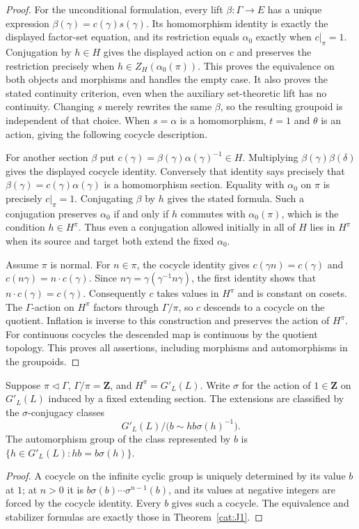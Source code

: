 \begin{proof}
For the unconditional formulation, every lift $\beta:\Gamma\to E$
has a unique expression $\beta(\gamma)=c(\gamma)s(\gamma)$.
Its homomorphism identity is exactly the displayed factor-set equation,
and its restriction equals $\alpha_0$ exactly when $c|_\pi=1$.
Conjugation by $h\in H$ gives the displayed action on $c$ and preserves
the restriction precisely when $h\in Z_H(\alpha_0(\pi))$.
This proves the equivalence on both objects and morphisms and handles
the empty case.  It also proves the stated continuity criterion, even
when the auxiliary set-theoretic lift has no continuity.
Changing $s$ merely rewrites the same $\beta$, so the resulting groupoid
is independent of that choice.  When $s=\alpha$ is a homomorphism,
$t=1$ and $\theta$ is an action, giving the following cocycle description.

For another section $\beta$ put
$c(\gamma)=\beta(\gamma)\alpha(\gamma)^{-1}\in H$.
Multiplying $\beta(\gamma)\beta(\delta)$ gives the displayed cocycle
identity.  Conversely that identity says precisely that
$\beta(\gamma)=c(\gamma)\alpha(\gamma)$ is a homomorphism section.
Equality with $\alpha_0$ on $\pi$ is precisely $c|_\pi=1$.
Conjugating $\beta$ by $h$ gives the stated formula.  Such a conjugation
preserves $\alpha_0$ if and only if $h$ commutes with $\alpha_0(\pi)$,
which is the condition $h\in H^\pi$.  Thus even a conjugation allowed
initially in all of $H$ lies in $H^\pi$ when its source and target both
extend the fixed $\alpha_0$.

Assume $\pi$ is normal.  For $n\in\pi$, the cocycle identity gives
$c(\gamma n)=c(\gamma)$ and
$c(n\gamma)=n\cdot c(\gamma)$.  Since
$n\gamma=\gamma(\gamma^{-1}n\gamma)$, the first identity shows that
$n\cdot c(\gamma)=c(\gamma)$.  Consequently $c$ takes values in $H^\pi$
and is constant on cosets.  The $\Gamma$-action on $H^\pi$ factors
through $\Gamma/\pi$, so $c$ descends to a cocycle on the quotient.
Inflation is inverse to this construction and preserves the action of
$H^\pi$.  For continuous cocycles the descended map is continuous by
the quotient topology.  This proves all assertions, including morphisms
and automorphisms in the groupoids.
\end{proof}

\begin{corollary}\label{cat:J2}
Suppose $\pi\triangleleft\Gamma$, $\Gamma/\pi=\mathbf Z$, and
$H^\pi=G'_L(L)$.  Write $\sigma$ for the action of $1\in\mathbf Z$ on
$G'_L(L)$ induced by a fixed extending section.  The extensions are
classified by the $\sigma$-conjugacy classes
\[
 G'_L(L)/\bigl(b\sim h b\sigma(h)^{-1}\bigr).
\]
The automorphism group of the class represented by $b$ is
$\{h\in G'_L(L):h b=b\sigma(h)\}$.
\end{corollary}
\begin{proof}
A cocycle on the infinite cyclic group is uniquely determined by its
value $b$ at $1$; at $n>0$ it is
$b\sigma(b)\cdots\sigma^{n-1}(b)$, and its values at negative integers
are forced by the cocycle identity.  Every $b$ gives such a cocycle.
The equivalence and stabilizer formulas are exactly those in
Theorem~\ref{cat:J1}.
\end{proof}

